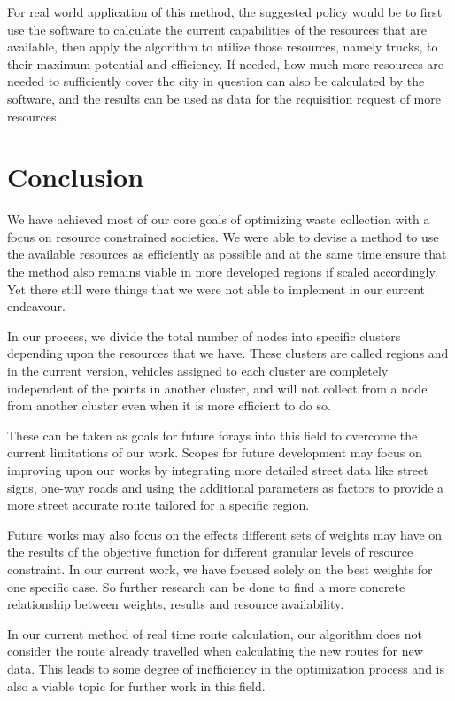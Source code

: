 \documentclass[12pt]{article}
\begin{document}
For real world application of this method, the suggested policy would be to first use the software to calculate the current capabilities of the resources that are available, then apply the algorithm to utilize those resources, namely trucks, to their maximum potential and efficiency. If needed, how much more resources are needed to sufficiently cover the city in question can also be calculated by the software, and the results can be used as data for the requisition request of more resources.

\section{Conclusion}
We have achieved most of our core goals of optimizing waste collection with a focus on resource constrained societies. We were able to devise a method to use the available resources as efficiently as possible and at the same time ensure that the method also remains viable in more developed regions if scaled accordingly. Yet there still were things that we were not able to implement in our current endeavour. 

In our process, we divide the total number of nodes into specific clusters depending upon the resources that we have. These clusters are called regions and in the current version, vehicles assigned to each cluster are completely independent of the points in another cluster, and will not collect from a node from another cluster even when it is more efficient to do so. 

These can be taken as goals for future forays into this field to overcome the current limitations of our work. Scopes for future development may focus on improving upon our works by integrating more detailed street data like street signs, one-way roads and using the additional parameters as factors to provide a more street accurate route tailored for a specific region.

Future works may also focus on the effects different sets of weights may have on the results of the objective function for different granular levels of resource constraint. In our current work, we have focused solely on the best weights for one specific case. So further research can be done to find a more concrete relationship between weights, results and resource availability. 

In our current method of real time route calculation, our algorithm does not consider the route already travelled when calculating the new routes for new data. This leads to some degree of inefficiency in the optimization process and is also a viable topic for further work in this field.



\end{document}
